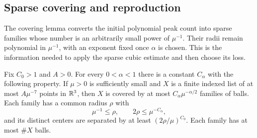 \subsection{Sparse covering and reproduction}

The covering lemma converts the initial polynomial peak count into
sparse families whose number is an arbitrarily small power of
\(\mu^{-1}\).  Their radii remain polynomial in \(\mu^{-1}\), with an
exponent fixed once \(\alpha\) is chosen.  This is the information
needed to apply the sparse cubic estimate and then choose its loss.

\begin{lemma}\label{glob:sparse-covering}
Fix $C_0>1$ and $A>0$. For every $0<\alpha<1$ there is a constant
$C_\alpha$ with the following property. If $\mu>0$ is sufficiently
small and $X$ is a finite indexed list of at most $A\mu^{-7}$ points
in $\mathbb R^3$, then $X$ is covered by at most
$C_\alpha\mu^{-\alpha/2}$ families of balls. Each family has a common
radius $\rho$ with
\begin{equation}\label{glob:covering-radii}
           \mu^{-1}\le\rho,\qquad 2\rho\le\mu^{-C_\alpha},
\end{equation}
and its distinct centers are separated by at least
$(2\rho/\mu)^{C_0}$. Each family has at most $\#X$ balls.
\end{lemma}

